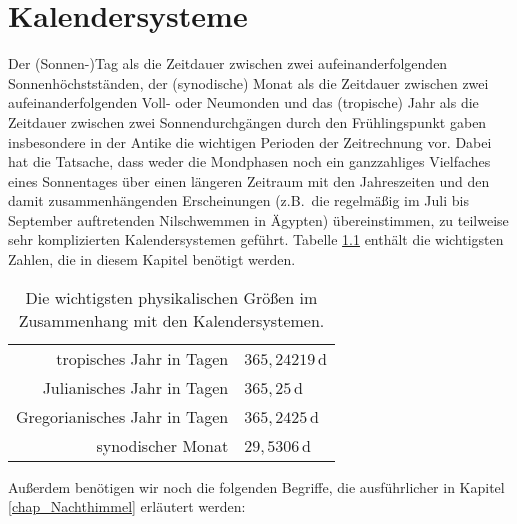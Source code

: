 
\chapter{Kalendersysteme}

%
Der (Sonnen-)Tag als die Zeitdauer 
zwischen zwei aufeinanderfolgenden Sonnenh\"ochstst\"anden, der 
(synodische) Monat als die Zeitdauer zwischen zwei aufeinanderfolgenden Voll- oder Neumonden und das 
(tropische) Jahr als die Zeitdauer zwischen zwei Sonnendurchg\"angen durch den Fr\"uhlingspunkt
gaben insbesondere in der Antike die wichtigen Perioden der Zeitrechnung vor. Dabei hat
die Tatsache, dass weder die Mondphasen noch ein ganzzahliges Vielfaches eines Sonnentages 
\"uber einen l\"angeren Zeitraum mit den Jahreszeiten und den damit zusammenh\"angenden 
Erscheinungen (z.B.\ die regelm\"a\ss ig im Juli bis September auftretenden Nilschwemmen in \"Agypten)
\"ubereinstimmen, zu teilweise sehr komplizierten Kalendersystemen gef\"uhrt. 
Tabelle \ref{tab_Kal} enth\"alt die wichtigsten Zahlen, die in diesem Kapitel ben\"otigt werden.

\begin{table}[htb]
\begin{tabular}{r|l}
tropisches Jahr in Tagen &  $365, 24219$\,d   \\
Julianisches Jahr in Tagen &  $365,25$\,d \\
Gregorianisches Jahr in Tagen & $ 365,2425$\,d \\
synodischer Monat &  $29,5306$\,d \\
\end{tabular}
\caption{\label{tab_Kal}%
Die wichtigsten physikalischen Gr\"o\ss en im Zusammenhang mit den
Kalendersystemen.}
\end{table}

Au\ss erdem ben\"otigen wir noch die folgenden Begriffe, die ausf\"uhrlicher in
Kapitel \ref{chap_Nachthimmel} erl\"autert werden:

